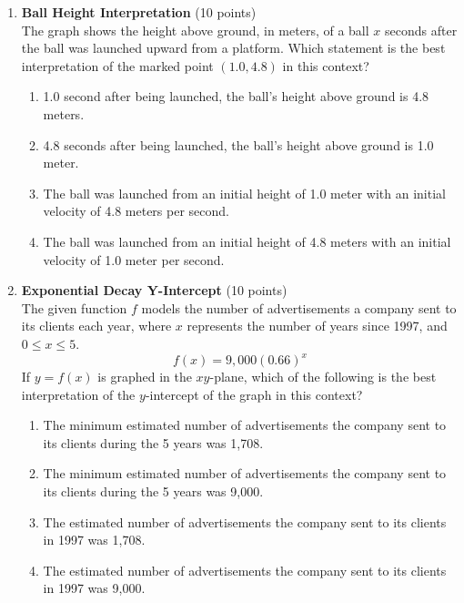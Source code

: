 \begin{enumerate}
  \newpage

  \item \textbf{Ball Height Interpretation} (10 points)\\
  The graph shows the height above ground, in meters, of a ball $x$ seconds after the ball was launched upward from a platform. Which statement is the best interpretation of the marked point $(1.0, 4.8)$ in this context?
  \begin{enumerate}[label=(\Alph*)]
    \item 1.0 second after being launched, the ball's height above ground is 4.8 meters.
    \item 4.8 seconds after being launched, the ball's height above ground is 1.0 meter.
    \item The ball was launched from an initial height of 1.0 meter with an initial velocity of 4.8 meters per second.
    \item The ball was launched from an initial height of 4.8 meters with an initial velocity of 1.0 meter per second.
  \end{enumerate}
  \begin{subanswer}
  \end{subanswer}

  \newpage

  \item \textbf{Exponential Decay Y-Intercept} (10 points)\\
  The given function $f$ models the number of advertisements a company sent to its clients each year, where $x$ represents the number of years since 1997, and $0 \leq x \leq 5$.
  \[
  f(x)=9,000(0.66)^{x}
  \]
  If $y=f(x)$ is graphed in the $xy$-plane, which of the following is the best interpretation of the $y$-intercept of the graph in this context?
  \begin{enumerate}[label=(\Alph*)]
    \item The minimum estimated number of advertisements the company sent to its clients during the 5 years was 1,708.
    \item The minimum estimated number of advertisements the company sent to its clients during the 5 years was 9,000.
    \item The estimated number of advertisements the company sent to its clients in 1997 was 1,708.
    \item The estimated number of advertisements the company sent to its clients in 1997 was 9,000.
  \end{enumerate}
  \begin{subanswer}
  \end{subanswer}


\end{enumerate}
